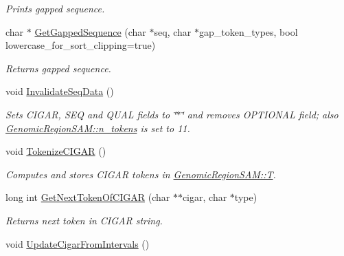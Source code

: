 \begin{DoxyCompactItemize}
\begin{DoxyCompactList}\small\item\em Prints gapped sequence. \end{DoxyCompactList}\item 
\hypertarget{classGenomicRegionSAM_a9446540150b384ca0d3dbba630c9c6a6}{
char $\ast$ \hyperlink{classGenomicRegionSAM_a9446540150b384ca0d3dbba630c9c6a6}{GetGappedSequence} (char $\ast$seq, char $\ast$gap\_\-token\_\-types, bool lowercase\_\-for\_\-sort\_\-clipping=true)}
\label{classGenomicRegionSAM_a9446540150b384ca0d3dbba630c9c6a6}

\begin{DoxyCompactList}\small\item\em Returns gapped sequence. \end{DoxyCompactList}\item 
\hypertarget{classGenomicRegionSAM_a621b3dd6f4d03a5223bd26a57af14f7e}{
void \hyperlink{classGenomicRegionSAM_a621b3dd6f4d03a5223bd26a57af14f7e}{InvalidateSeqData} ()}
\label{classGenomicRegionSAM_a621b3dd6f4d03a5223bd26a57af14f7e}

\begin{DoxyCompactList}\small\item\em Sets CIGAR, SEQ and QUAL fields to \char`\"{}$\ast$\char`\"{} and removes OPTIONAL field; also \hyperlink{classGenomicRegionSAM_a281e35ef1bd0b7da811d9b8957f3d08f}{GenomicRegionSAM::n\_\-tokens} is set to 11. \end{DoxyCompactList}\item 
\hypertarget{classGenomicRegionSAM_a34b0387b9656e48d0c4046d62fe085e1}{
void \hyperlink{classGenomicRegionSAM_a34b0387b9656e48d0c4046d62fe085e1}{TokenizeCIGAR} ()}
\label{classGenomicRegionSAM_a34b0387b9656e48d0c4046d62fe085e1}

\begin{DoxyCompactList}\small\item\em Computes and stores CIGAR tokens in \hyperlink{classGenomicRegionSAM_a47afdde68b89cf4ea199bc91d4954a92}{GenomicRegionSAM::T}. \end{DoxyCompactList}\item 
\hypertarget{classGenomicRegionSAM_a50198fead1c40caadf76f40b61a3c14a}{
long int \hyperlink{classGenomicRegionSAM_a50198fead1c40caadf76f40b61a3c14a}{GetNextTokenOfCIGAR} (char $\ast$$\ast$cigar, char $\ast$type)}
\label{classGenomicRegionSAM_a50198fead1c40caadf76f40b61a3c14a}

\begin{DoxyCompactList}\small\item\em Returns next token in CIGAR string. \end{DoxyCompactList}\item 
\hypertarget{classGenomicRegionSAM_a965bb3cc1217e6c859a07dd23090c2a0}{
void \hyperlink{classGenomicRegionSAM_a965bb3cc1217e6c859a07dd23090c2a0}{UpdateCigarFromIntervals} ()}
\label{classGenomicRegionSAM_a965bb3cc1217e6c859a07dd23090c2a0}


\end{DoxyCompactItemize}
